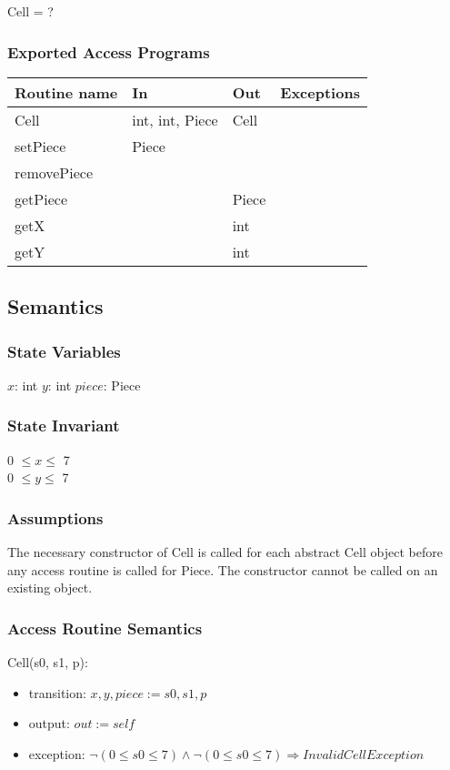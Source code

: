 \documentclass[12pt]{article}
\begin{document}
Cell = ?

\subsubsection* {Exported Access Programs}

\begin{tabular}{| l | l | l | l |}
\hline
\textbf{Routine name} & \textbf{In} & \textbf{Out} & \textbf{Exceptions}\\
\hline
Cell & int, int, Piece & Cell & ~\\
\hline
setPiece & Piece & ~ & ~\\
\hline
removePiece & ~ & ~ & ~\\
\hline
getPiece & ~ & Piece & ~\\
\hline
getX & ~ & int & ~\\
\hline
getY & ~ & int & ~\\
\hline
\end{tabular}

\subsection* {Semantics}

\subsubsection* {State Variables}

$x$: int
$y$: int
$piece$: Piece

\subsubsection* {State Invariant}

0 $\leq x \leq$ 7\\
0 $\leq y \leq$ 7 

\subsubsection* {Assumptions}
The necessary constructor of Cell is called for each abstract Cell object before any
access routine is called for Piece.  The constructor cannot be called on
an existing object.

\subsubsection* {Access Routine Semantics}

Cell(s0, s1, p):
\begin{itemize}
\item transition: $x,y,piece := s0,s1,p$
\item output: $out := \mathit{self}$
\item exception: $ \neg (0 \leq s0 \leq 7) \wedge  \neg (0 \leq s0 \leq 7) \Rightarrow InvalidCellException$
\end{itemize}
\end{document}
